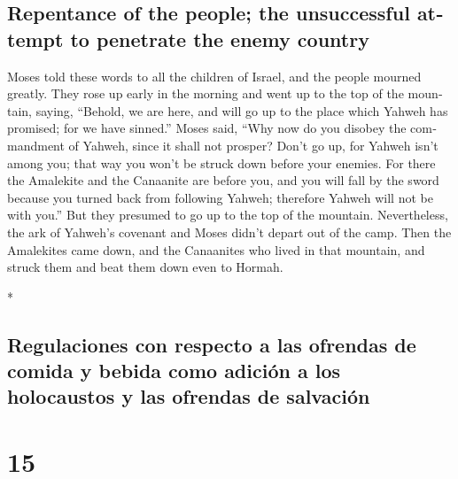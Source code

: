 \begin{paracol}{2}
\begin{otherlanguage}{english}
\hypertarget{repentance-of-the-people-the-unsuccessful-attempt-to-penetrate-the-enemy-country}{%
\subsection{Repentance of the people; the unsuccessful attempt to
penetrate the enemy
country}\label{repentance-of-the-people-the-unsuccessful-attempt-to-penetrate-the-enemy-country}}

 Moses told these words to all the children of Israel,
and the people mourned greatly.  They rose up early in
the morning and went up to the top of the mountain, saying, ``Behold, we
are here, and will go up to the place which Yahweh has promised; for we
have sinned.''  Moses said, ``Why now do you disobey the
commandment of Yahweh, since it shall not prosper?  Don't
go up, for Yahweh isn't among you; that way you won't be struck down
before your enemies.  For there the Amalekite and the
Canaanite are before you, and you will fall by the sword because you
turned back from following Yahweh; therefore Yahweh will not be with
you.''  But they presumed to go up to the top of the
mountain. Nevertheless, the ark of Yahweh's covenant and Moses didn't
depart out of the camp.  Then the Amalekites came down,
and the Canaanites who lived in that mountain, and struck them and beat
them down even to Hormah.

\end{otherlanguage}

\switchcolumn[0]*

\hypertarget{regulaciones-con-respecto-a-las-ofrendas-de-comida-y-bebida-como-adiciuxf3n-a-los-holocaustos-y-las-ofrendas-de-salvaciuxf3n}{%
\subsection{Regulaciones con respecto a las ofrendas de comida y bebida
como adición a los holocaustos y las ofrendas de
salvación}\label{regulaciones-con-respecto-a-las-ofrendas-de-comida-y-bebida-como-adiciuxf3n-a-los-holocaustos-y-las-ofrendas-de-salvaciuxf3n}}

\hypertarget{section-28}{%
\section{15}\label{section-28}}


\end{paracol}
